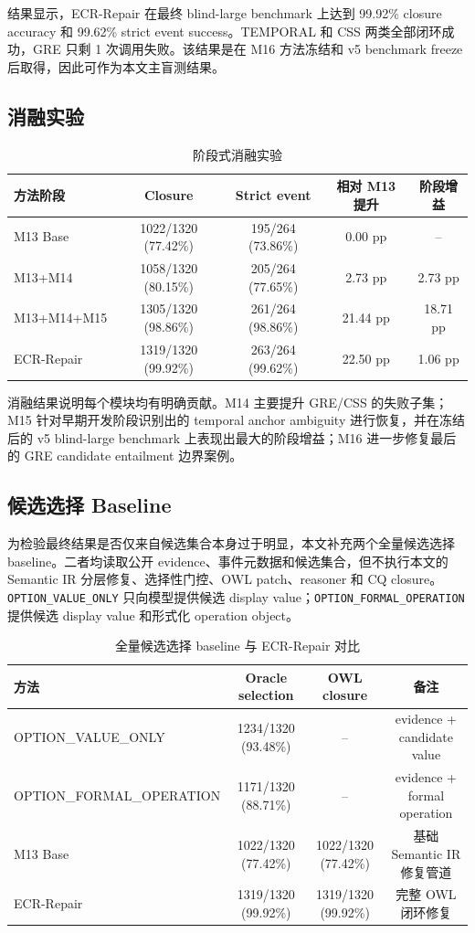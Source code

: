 \documentclass[11pt]{article}
\begin{document}
结果显示，ECR-Repair 在最终 blind-large benchmark 上达到 99.92\% closure accuracy 和 99.62\% strict event success。TEMPORAL 和 CSS 两类全部闭环成功，GRE 只剩 1 次调用失败。该结果是在 M16 方法冻结和 v5 benchmark freeze 后取得，因此可作为本文主盲测结果。

\subsection{消融实验}

\begin{table}[t]
\centering
\caption{阶段式消融实验}
\label{tab:ablation}
\begin{tabular}{lcccc}
\toprule
方法阶段 & Closure & Strict event & 相对 M13 提升 & 阶段增益 \\
\midrule
M13 Base & 1022/1320 (77.42\%) & 195/264 (73.86\%) & 0.00 pp & -- \\
M13+M14 & 1058/1320 (80.15\%) & 205/264 (77.65\%) & 2.73 pp & 2.73 pp \\
M13+M14+M15 & 1305/1320 (98.86\%) & 261/264 (98.86\%) & 21.44 pp & 18.71 pp \\
ECR-Repair & 1319/1320 (99.92\%) & 263/264 (99.62\%) & 22.50 pp & 1.06 pp \\
\bottomrule
\end{tabular}
\end{table}

消融结果说明每个模块均有明确贡献。M14 主要提升 GRE/CSS 的失败子集；M15 针对早期开发阶段识别出的 temporal anchor ambiguity 进行恢复，并在冻结后的 v5 blind-large benchmark 上表现出最大的阶段增益；M16 进一步修复最后的 GRE candidate entailment 边界案例。

\subsection{候选选择 Baseline}

为检验最终结果是否仅来自候选集合本身过于明显，本文补充两个全量候选选择 baseline。二者均读取公开 evidence、事件元数据和候选集合，但不执行本文的 Semantic IR 分层修复、选择性门控、OWL patch、reasoner 和 CQ closure。\texttt{OPTION\_VALUE\_ONLY} 只向模型提供候选 display value；\texttt{OPTION\_FORMAL\_OPERATION} 提供候选 display value 和形式化 operation object。

\begin{table}[t]
\centering
\caption{全量候选选择 baseline 与 ECR-Repair 对比}
\label{tab:baselines}
\begin{tabular}{lccc}
\toprule
方法 & Oracle selection & OWL closure & 备注 \\
\midrule
OPTION\_VALUE\_ONLY & 1234/1320 (93.48\%) & -- & evidence + candidate value \\
OPTION\_FORMAL\_OPERATION & 1171/1320 (88.71\%) & -- & evidence + formal operation \\
M13 Base & 1022/1320 (77.42\%) & 1022/1320 (77.42\%) & 基础 Semantic IR 修复管道 \\
ECR-Repair & 1319/1320 (99.92\%) & 1319/1320 (99.92\%) & 完整 OWL 闭环修复 \\
\bottomrule
\end{tabular}
\end{table}
\end{document}

